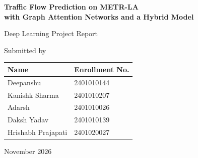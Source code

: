 \documentclass[11pt,a4paper]{article}
\begin{document}
\begin{titlepage}
\centering
\vspace*{3cm}
{\LARGE\bfseries Traffic Flow Prediction on METR-LA\\[0.3em] with Graph Attention Networks and a Hybrid Model\par}
\vspace{1.2cm}
{\large Deep Learning \textperiodcentered{}  Project Report\par}
\vspace{2.5cm}
{\large Submitted by\par}
\vspace{0.5cm}
\begin{tabular}{ll}
\toprule
Name & Enrollment No. \\
\midrule
Deepanshu & 2401010144 \\
Kanishk Sharma & 2401010207 \\
Adarsh & 2401010026 \\
Daksh Yadav & 2401010139 \\
Hrishabh Prajapati & 2401020027 \\
\bottomrule
\end{tabular}
\vfill
{\large November 2026\par}
\end{titlepage}

\begin{abstract}
We forecast traffic speed 5 to 60 minutes ahead at the 207 sensors of the METR-LA dataset
and ask whether a model that uses the road network does better than separate models for
each road segment. We trained three models. The first is a set of 207 XGBoost models, one
per sensor, that only see their own sensor's history (MAE 3.20\,mph). The second, ST-GAT,
is a graph attention network that lets every sensor look at its upstream and downstream
neighbours on the road graph (3.04\,mph). The third is a hybrid in which the graph network
learns a correction to the XGBoost forecasts (3.06\,mph, and the best model at 15 minutes).
Both network models beat the per-segment models at every horizon, with the largest gains
during rush hour and congestion. Ablation runs show that most of the gain comes from using
the road graph and from handling missing sensor readings properly. A simple offline
experiment also shows that the better forecasts would let a traffic signal switch to a
congestion plan earlier. This is a simulation only; we did not control real signals.
\end{abstract}
\newpage
\tableofcontents
\newpage
\end{document}
